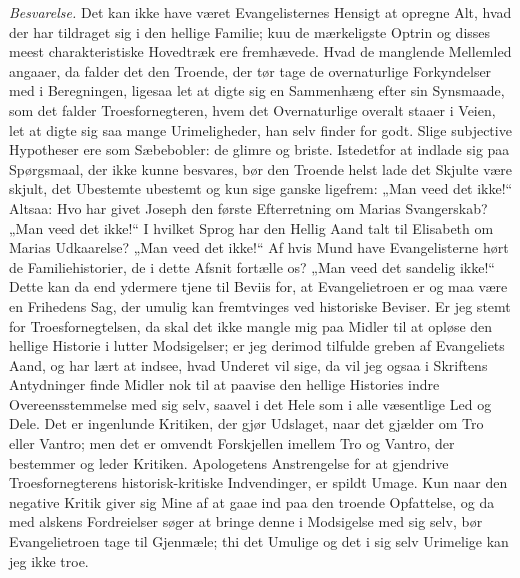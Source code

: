 \documentclass[12pt,a4paper]{book}
\begin{document}
\emph{Besvarelse.} Det kan ikke have været Evangelisternes Hensigt at opregne
Alt, hvad der har tildraget sig i den hellige Familie;
kuu de mærkeligste Optrin og disses meest charakteristiske Hovedtræk ere
fremhævede. Hvad de manglende Mellemled angaaer, da falder det den Troende, der
tør tage de overnaturlige Forkyndelser med i Beregningen, ligesaa let at digte
sig en Sammenhæng efter sin Synsmaade, som det falder Troesfornegteren, hvem det
Overnaturlige overalt staaer i Veien, let at digte sig saa mange Urimeligheder,
han selv finder for godt. Slige subjective Hypotheser ere som Sæbebobler: de
glimre og briste. Istedetfor at indlade sig paa Spørgsmaal, der ikke kunne
besvares, bør den Troende helst lade det Skjulte være skjult, det Ubestemte
ubestemt
og kun sige ganske ligefrem: „Man veed det ikke!“ Altsaa: Hvo har givet Joseph
den første Efterretning om Marias Svangerskab? „Man veed det ikke!“ I hvilket
Sprog har den Hellig Aand talt til Elisabeth om Marias Udkaarelse? „Man veed det
ikke!“ Af hvis Mund have Evangelisterne hørt de Familiehistorier, de i dette
Afsnit fortælle os? „Man veed det sandelig ikke!“ Dette kan da end ydermere tjene
til Beviis for, at Evangelietroen er og maa være en Frihedens Sag, der umulig
kan fremtvinges ved historiske Beviser. Er jeg stemt for Troesfornegtelsen, da
skal det ikke mangle mig paa Midler til at opløse den hellige Historie i lutter
Modsigelser; er jeg derimod tilfulde greben af Evangeliets Aand, og har lært at
indsee, hvad Underet vil sige, da vil jeg ogsaa i Skriftens Antydninger finde
Midler nok til at paavise den hellige Histories indre Overeensstemmelse med sig
selv, saavel i det Hele som i alle væsentlige Led og Dele. Det er ingenlunde
Kritiken, der gjør Udslaget, naar det gjælder om Tro eller Vantro; men det er
omvendt Forskjellen imellem Tro og Vantro, der bestemmer og leder Kritiken.
Apologetens Anstrengelse for at gjendrive Troesfornegterens historisk-kritiske
Indvendinger, er spildt Umage. Kun naar den negative Kritik giver sig Mine af at
gaae ind paa den troende Opfattelse, og da med alskens Fordreielser søger at
bringe denne i Modsigelse med sig selv, bør Evangelietroen tage til Gjenmæle;
thi det Umulige og det i sig selv Urimelige kan jeg ikke troe.
\end{document}
